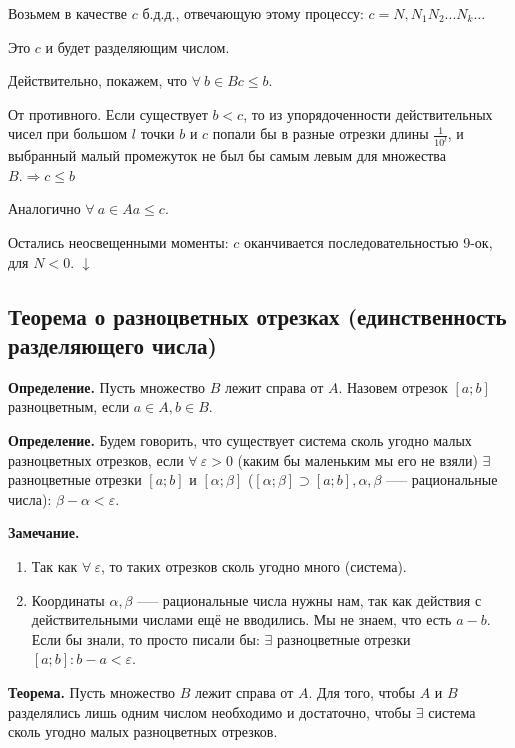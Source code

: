 \documentclass{article}
\begin{document}
        Возьмем в качестве $c$ б.д.д., отвечающую этому процессу: $c = N,N_1N_2...N_k...$

        Это $c$ и будет разделяющим числом.
        
        Действительно, покажем, что $\forall\ b \in B c \leq b$.

        От противного. Если существует $b < c$, то из упорядоченности действительных чисел при большом $l$ точки $b$ и $c$ попали бы в разные отрезки длины $\frac{1}{10^l}$, и выбранный малый промежуток не был бы самым левым для множества $B. \Rightarrow c \leq b$

        Аналогично $\forall\ a \in A a \leq c$.

        Остались неосвещенными моменты: $c$ оканчивается последовательностью 9-ок, для $N < 0$. $\downarrow$

        \subsection{Теорема о разноцветных отрезках (единственность разделяющего числа)}
        \textbf{Определение.} Пусть множество $B$ лежит справа от $A$. Назовем отрезок $[a; b]$ разноцветным, если $a \in A, b \in B$.

        \textbf{Определение.} Будем говорить, что существует система сколь угодно малых разноцветных отрезков, если $\forall\ \varepsilon > 0$ (каким бы маленьким мы его не взяли) $\exists$ разноцветные отрезки $[a; b]$ и $[\alpha; \beta]$ ($[\alpha; \beta] \supset [a; b], \alpha, \beta$ --— рациональные числа): $\beta - \alpha < \varepsilon$. 

        \textbf{Замечание.}

        \begin{enumerate}
            \item Так как $\forall\ \varepsilon$, то таких отрезков сколь угодно много (система).
            \item Координаты $\alpha, \beta$ —-- рациональные числа нужны нам, так как действия с действительными числами ещё не вводились. Мы не знаем, что есть $a - b$. Если бы знали, то просто писали бы: $\exists$ разноцветные отрезки $[a; b]: b - a < \varepsilon$.
        \end{enumerate}

        \textbf{Теорема.} Пусть множество $B$ лежит справа от $A$. Для того, чтобы $A$ и $B$ разделялись лишь одним числом необходимо и достаточно, чтобы $\exists$ система сколь угодно малых разноцветных отрезков. 
\end{document}
